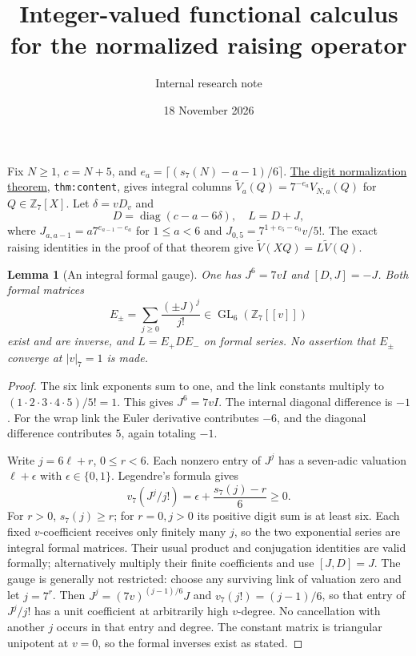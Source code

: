 \documentclass[11pt]{article}
\title{Integer-valued functional calculus for the normalized raising operator}
\author{Internal research note}\date{18 November 2026}
\newtheorem{lemma}{Lemma}\newtheorem{proposition}[lemma]{Proposition}\newtheorem{corollary}[lemma]{Corollary}
\begin{document}
\maketitle
Fix $N\ge1$, $c=N+5$, and
$e_a=\lceil(s_7(N)-a-1)/6\rceil$.
\href{GAP_SIX_DIGIT_NORMALIZATION_AND_FINITE_GAUGE.tex}{The digit normalization theorem}, \texttt{thm:content}, gives integral columns
$\widetilde V_a(Q)=7^{-e_a}V_{N,a}(Q)$ for $Q\in\mathbb Z_7[X]$.
Let $\delta=vD_v$ and
\[
 D=\operatorname{diag}(c-a-6\delta),\quad L=D+J,
\]
where $J_{a,a-1}=a7^{e_{a-1}-e_a}$ for $1\le a<6$ and
$J_{0,5}=7^{1+e_5-e_0}v/5!$.
The exact raising identities in the proof of that theorem give
$\widetilde V(XQ)=L\widetilde V(Q)$.

\begin{lemma}[An integral formal gauge]\label{lem:formal}
One has $J^6=7vI$ and $[D,J]=-J$.
Both formal matrices
\[
 E_\pm=\sum_{j\ge0}\frac{(\pm J)^j}{j!}
          \in\operatorname{GL}_6(\mathbb Z_7[[v]])
\]
exist and are inverse, and $L=E_+DE_-$ on formal series.
No assertion that $E_\pm$ converge at $|v|_7=1$ is made.
\end{lemma}
\begin{proof}
The six link exponents sum to one, and the link constants
multiply to $(1\cdot2\cdot3\cdot4\cdot5)/5!=1$.
This gives $J^6=7vI$.
The internal diagonal difference is $-1$.
For the wrap link the Euler derivative contributes $-6$,
and the diagonal difference contributes $5$, again totaling $-1$.

Write $j=6\ell+r$, $0\le r<6$.
Each nonzero entry of $J^j$ has a seven-adic valuation
$\ell+\epsilon$ with $\epsilon\in\{0,1\}$.
Legendre's formula gives
\[
 v_7(J^j/j!)=\epsilon+\frac{s_7(j)-r}{6}\ge0.
\]
For $r>0$, $s_7(j)\ge r$; for $r=0,j>0$ its positive digit sum
is at least six. Each fixed $v$-coefficient receives only
finitely many $j$, so the two exponential series are integral
formal matrices. Their usual product and conjugation identities
are valid formally; alternatively multiply their finite
coefficients and use $[J,D]=J$.
The gauge is generally not restricted: choose any surviving
link of valuation zero and let $j=7^r$. Then
$J^j=(7v)^{(j-1)/6}J$ and
$v_7(j!)=(j-1)/6$, so that entry of $J^j/j!$
has a unit coefficient at arbitrarily high $v$-degree.
No cancellation with another $j$ occurs in that entry and degree.
The constant matrix is triangular unipotent at $v=0$,
so the formal inverses exist as stated.
\end{proof}
\end{document}
